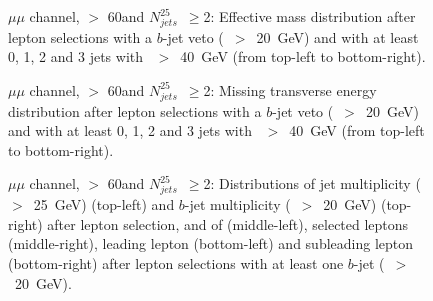 \begin{figure}[h!]
\centering
{}
\caption{$\mu\mu$ channel, \met $>$ 60\GeV and $N_{jets}^{25}$~$\ge$2: Effective mass distribution after lepton selections with a $b$-jet veto (\pt~$>$~20~GeV) and with at least 0, 1, 2 and 3 jets with \pt~$>$~40~GeV (from top-left to bottom-right).}
\label{Fig:VP_mm_1b_Meff}
\end{figure}
\begin{figure}[h!]
\centering
{}
\caption{$\mu\mu$ channel, \met $>$ 60\GeV and $N_{jets}^{25}$~$\ge$2: Missing transverse energy distribution after lepton selections with a $b$-jet veto (\pt~$>$~20~GeV) and with at least 0, 1, 2 and 3 jets with \pt~$>$~40~GeV (from top-left to bottom-right).}
\label{Fig:VP_mm_1b_Met}
\end{figure}
\begin{figure}[h!]
\centering
{}
\caption{$\mu\mu$ channel, \met $>$ 60\GeV and $N_{jets}^{25}$~$\ge$2: Distributions of  jet multiplicity (\pt~$>$~25~GeV) (top-left) and $b$-jet multiplicity (\pt~$>$~20~GeV) (top-right) after lepton selection, and of \mt (middle-left), selected leptons \pt (middle-right), leading lepton \pt (bottom-left) and subleading lepton \pt (bottom-right) after lepton selections with at least one $b$-jet (\pt~$>$~20~GeV).}
\label{Fig:VP_mm_1b_Njets_and_other}
\end{figure} 




